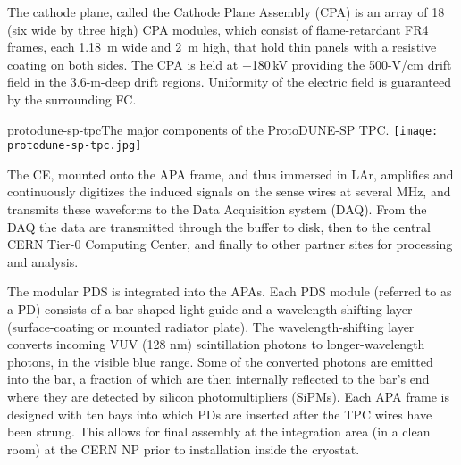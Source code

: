 The cathode plane, called the Cathode Plane Assembly (CPA) is an array of 18 (six wide by three high) CPA modules, which consist of  flame-retardant FR4 frames, each 1.18~m wide and 2~m high, that hold thin panels with a resistive coating on both sides. 
The CPA is held at $-$180\,kV providing the 500-V/cm drift field in the 3.6-m-deep drift regions. 
Uniformity of the electric field is guaranteed by the surrounding FC.
 
\begin{cdrfigure}{protodune-sp-tpc}{The major components of the ProtoDUNE-SP TPC. }
\texttt{[image: protodune-sp-tpc.jpg]}
\end{cdrfigure}

The CE, mounted onto the APA frame, and thus immersed in LAr, amplifies and continuously digitizes the induced signals on the sense wires at several MHz, and transmits these waveforms to the Data Acquisition system (DAQ). From the DAQ the data are  transmitted through the buffer to disk, then to the central CERN Tier-0 Computing Center, and finally to other partner sites for processing and analysis.  

The modular PDS is integrated into the APAs. Each PDS module (referred to as a PD) consists of a bar-shaped light guide and
a wavelength-shifting layer (surface-coating or mounted radiator plate). The wavelength-shifting layer converts incoming VUV (128 nm) 
scintillation photons to longer-wavelength photons, in the visible blue range. Some of the converted photons are emitted into the bar, a fraction of which are then internally reflected to the bar's end where they are detected by silicon photomultipliers (SiPMs).
Each APA frame is designed with ten bays into which PDs are inserted after the TPC wires have been strung. This  allows for final assembly at the integration area (in a clean room) at the CERN NP prior to installation inside the cryostat. 


